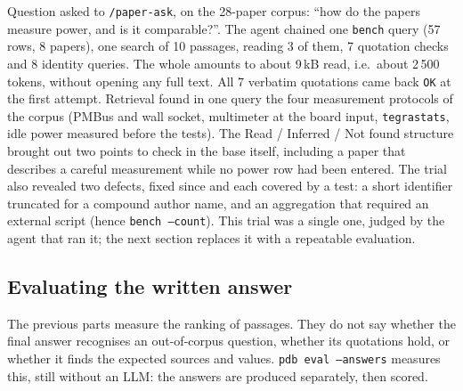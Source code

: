 \documentclass[11pt,a4paper]{article}
\newcommand{\cmd}[1]{\texttt{#1}}
\begin{document}
Question asked to \cmd{/paper-ask}, on the 28-paper corpus: ``how do the papers measure
power, and is it comparable?''. The agent chained one \cmd{bench} query (57 rows, 8 papers),
one search of 10 passages, reading 3 of them, 7 quotation checks and 8 identity queries. The
whole amounts to about 9\,kB read, i.e.\ about 2\,500 tokens, without opening any full text.
All 7 verbatim quotations came back \cmd{OK} at the first attempt. Retrieval found in one
query the four measurement protocols of the corpus (PMBus and wall socket, multimeter at the
board input, \cmd{tegrastats}, idle power measured before the tests). The Read / Inferred /
Not found structure brought out two points to check in the base itself, including a paper
that describes a careful measurement while no power row had been entered. The trial also
revealed two defects, fixed since and each covered by a test: a short identifier truncated
for a compound author name, and an aggregation that required an external script (hence
\cmd{bench --count}). This trial was a single one, judged by the agent that ran it; the next
section replaces it with a repeatable evaluation.

\subsection{Evaluating the written answer}
\label{sec:answers}

The previous parts measure the ranking of passages. They do not say whether the final answer
recognises an out-of-corpus question, whether its quotations hold, or whether it finds the
expected sources and values. \cmd{pdb eval --answers} measures this, still without an LLM:
the answers are produced separately, then scored.
\end{document}
